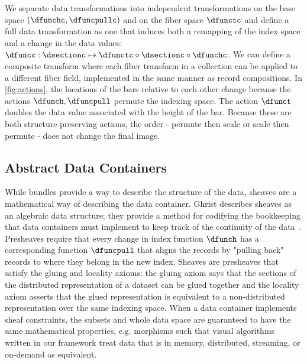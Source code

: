 \documentclass{vgtc}
\begin{document}
We separate data transformations into independent transformations on the base space $(\dfunchc, \dfuncpullc)$ and on the fiber space $\dfunctc$ and define a full data transformation as one that induces both a remapping of the index space and a change in the data values: $\dfuncc: \dsectionc\mapsto\dfunctc\circ\dsectionc\circ\dfunchc$.  We can define a composite transform where each fiber transform in a collection can be applied to a different fiber field, implemented in the same manner as record compositions. In \autoref{fig:actions}, the locations of the bars relative to each other change because the actions $\dfunch, \dfuncpull$ permute the indexing space. The action $\dfunct$ doubles the data value associated with the height of the bar. Because these are both structure preserving actions, the order - permute then scale or scale then permute - does not change the final image. 

\subsection{Abstract Data Containers}

While bundles provide a way to describe the structure of the data, sheaves are a mathematical way of describing the data container. Ghrist describes sheaves as an algebraic data structure; they provide a method for codifying the bookkeeping that data containers must implement to keep track of the continuity of the data~\cite{ghristElementaryAppliedTopology2014}. Presheaves require that every change in index function $\dfunch$ has a corresponding function $\dfuncpull$ that aligns the records by "pulling back" records to where they belong in the new index. Sheaves are presheaves that satisfy the gluing and locality axioms: the gluing axiom says that the sections of the distributed representation of a dataset can be glued together and the locality axiom asserts that the glued representation is equivalent to a non-distributed representation over the same indexing space. When a data container implements sheaf constraints, the subsets and whole data space are guaranteed to have the same mathematical properties, e.g. morphisms such that visual algorithms written in our framework treat data that is in memory, distributed, streaming, or on-demand as equivalent. 
\end{document}

